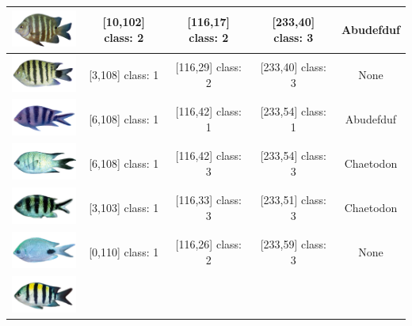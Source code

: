 \begin{longtable}{|c|c|c|c|c|}
	\hline
	\includegraphics[width=3cm]{gambar/dataset_validasi/Abudefduf11}
	& [10,102] class: 2 & [116,17] class: 2 & [233,40] class: 3 & Abudefduf \\
	\hline
	\includegraphics[width=3cm]{gambar/dataset_validasi/Abudefduf12}
	& [3,108] class: 1 & [116,29] class: 2 & [233,40] class: 3 & None \\
	\hline
	\includegraphics[width=3cm]{gambar/dataset_validasi/Abudefduf13}
	& [6,108] class: 1 & [116,42] class: 1 & [233,54] class: 1 & Abudefduf \\
	\hline
	\includegraphics[width=3cm]{gambar/dataset_validasi/Abudefduf14}
	& [6,108] class: 1 & [116,42] class: 3 & [233,54] class: 3 & Chaetodon \\
	\hline
	\includegraphics[width=3cm]{gambar/dataset_validasi/Abudefduf15}
	& [3,103] class: 1 & [116,33] class: 3 & [233,51] class: 3 & Chaetodon \\
	\hline
	\includegraphics[width=3cm]{gambar/dataset_validasi/Abudefduf16}
	& [0,110] class: 1 & [116,26] class: 2 & [233,59] class: 3 & None \\
	\hline
	\includegraphics[width=3cm]{gambar/dataset_validasi/Abudefduf17}

\end{longtable}
